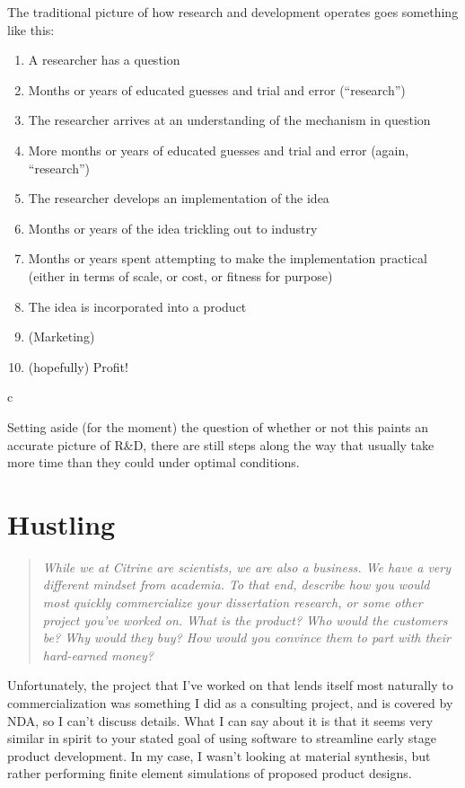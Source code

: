 \documentclass{article}
\begin{document}
The traditional picture of how research and development operates goes something like this:\vspace{0.5cm}
\begin{enumerate}
\item A researcher has a question
\item Months or years of educated guesses and trial and error (``research'')
\item The researcher arrives at an understanding of the mechanism in question
\item More months or years of educated guesses and trial and error (again, ``research'')
\item The researcher develops an implementation of the idea
\item Months or years of the idea trickling out to industry
\item Months or years spent attempting to make the implementation practical (either in terms of scale, or cost, or fitness for purpose)
\item The idea is incorporated into a product
\item (Marketing)
\item (hopefully) Profit!
\end{enumerate}c
\vspace{0.5cm}

Setting aside (for the moment) the question of whether or not this paints an accurate picture of R\&D, there are still steps along the way that usually take more time than they could under optimal conditions.

\section{Hustling}
\begin{quote} \sl
While we at Citrine are scientists, we are also a business. We have a very different mindset from academia. To that end, describe how you would most quickly commercialize your dissertation research, or some other project you've worked on. What is the product? Who would the customers be? Why would they buy? How would you convince them to part with their hard-earned money?
\end{quote}

Unfortunately, the project that I've worked on that lends itself most naturally to commercialization was something I did as a consulting project, and is covered by NDA, so I can't discuss details. What I can say about it is that it seems very similar in spirit to your stated goal of using software to streamline early stage product development. In my case, I wasn't looking at material synthesis, but rather performing finite element simulations of proposed product designs.
\end{document}
